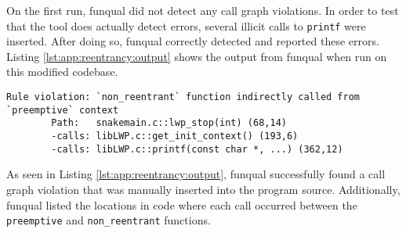 On the first run, funqual did not detect any call graph violations.  In order to test that the tool does actually detect errors, several illicit calls to \lstinline{printf} were inserted.  After doing so, funqual correctly detected and reported these errors.  Listing \ref{lst:app:reentrancy:output} shows the output from funqual when run on this modified codebase.

\noindent\begin{minipage}[t]{\linewidth}
\begin{lstlisting}[caption={Output from funqual when run on a project that had manually-inserted call graph violations},label={lst:app:reentrancy:output}]
Rule violation: `non_reentrant` function indirectly called from `preemptive` context
        Path:   snakemain.c::lwp_stop(int) (68,14)
        -calls: libLWP.c::get_init_context() (193,6)
        -calls: libLWP.c::printf(const char *, ...) (362,12)
\end{lstlisting}
\end{minipage}

As seen in Listing \ref{lst:app:reentrancy:output}, funqual successfully found a call graph violation that was manually inserted into the program source.  Additionally, funqual listed the locations in code where each call occurred between the \lstinline{preemptive} and \lstinline{non_reentrant} functions.  


